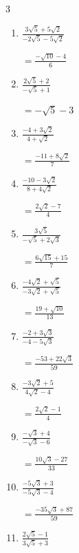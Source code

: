 \begin{multicols}{3}
\begin{enumerate}
  \item $\displaystyle \frac{3\sqrt{5}+5\sqrt{2}}{-2\sqrt{5}-5\sqrt{2}}$

        $\displaystyle =\frac{-\sqrt{10}-4}{6}$

  \item $\displaystyle \frac{2\sqrt{5}+2}{-\sqrt{5}+1}$

        $\displaystyle =-\sqrt{5}-3$

  \item $\displaystyle \frac{-4+3\sqrt{2}}{4+\sqrt{2}}$

        $\displaystyle =\frac{-11+8\sqrt{2}}{7}$

  \item $\displaystyle \frac{-10-3\sqrt{2}}{8+4\sqrt{2}}$

        $\displaystyle =\frac{2\sqrt{2}-7}{4}$

  \item $\displaystyle \frac{3\sqrt{5}}{-\sqrt{5}+2\sqrt{3}}$

        $\displaystyle =\frac{6\sqrt{15}+15}{7}$

\columnbreak %

  \item $\displaystyle \frac{-4\sqrt{2}+\sqrt{5}}{-3\sqrt{2}+\sqrt{5}}$

        $\displaystyle =\frac{19+\sqrt{10}}{13}$

  \item $\displaystyle \frac{-2+3\sqrt{3}}{-4-5\sqrt{3}}$

        $\displaystyle =\frac{-53+22\sqrt{3}}{59}$

  \item $\displaystyle \frac{-3\sqrt{2}+5}{4\sqrt{2}-4}$

        $\displaystyle =\frac{2\sqrt{2}-1}{4}$

  \item $\displaystyle \frac{-\sqrt{3}+4}{-\sqrt{3}-6}$

        $\displaystyle =\frac{10\sqrt{3}-27}{33}$

  \item $\displaystyle \frac{-5\sqrt{3}+3}{-5\sqrt{3}-4}$

        $\displaystyle =\frac{-35\sqrt{3}+87}{59}$

\columnbreak %

\resetques

  \item $\displaystyle \frac{2\sqrt{5}-1}{3\sqrt{5}+3}$


\end{enumerate}
\end{multicols}
